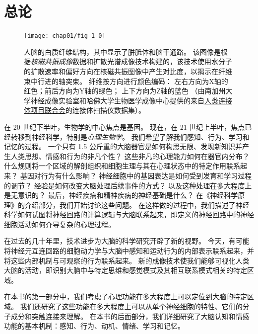\hypersetup{bookmarksopen=false}

\part{总论}

\begin{figure}[htbp]
	\centering
	\texttt{[image: chap01/fig\_1\_0]}
	\caption{人脑的白质纤维结构，其中显示了胼胝体和脑干通路。
		该图像是根据\textit{核磁共振成像}数据和扩散光谱成像技术构建的，该技术使用水分子的扩散速率和偏好方向在核磁共振图像中产生对比度，以揭示在纤维束中行进的轴突束。
		纤维按方向进行颜色编码：
		左右方向为X轴的红色；前后方向为Y轴的绿色；
		上下方向为Z轴的蓝色
		（由南加州大学神经成像实验室和哈佛大学生物医学成像中心提供的来自\href{www.humanconnetomproject.org}{人类连接体项目联合会}的连接体扫描仪数据集）。}
	\label{fig:1_0}
\end{figure}

在 20 世纪下半叶，生物学的中心焦点是基因。
现在，在 21 世纪上半叶，焦点已经转移到神经科学，特别是\textit{心理生物学}。
我们希望了解我们感知、行为、学习和记忆的过程。
一个只有 1.5 公斤重的大脑器官是如何构思无限、发现新知识并产生人类思想、情感和行为的非凡个性？
这些非凡的心理能力如何在器官内分布？
什么规则将一个区域的解剖组织和细胞生理与其在心理状态中的特定作用联系起来？
基因对行为有什么影响？
神经细胞中的基因表达是如何受到发育和学习过程的调节？
经验是如何改变大脑处理后续事件的方式？
以及这种处理在多大程度上是无意识的？
最后，神经疾病和精神疾病的神经基础是什么？
在《神经科学原理》的介绍部分，我们开始讨论这些问题。
在这样做的过程中，我们描述了神经科学如何试图将神经回路的计算逻辑与大脑联系起来，即定义的神经回路中的神经细胞活动如何介导复杂的心理过程。


在过去的几十年里，技术进步为大脑的科学研究开辟了新的视野。
今天，有可能将神经元互连回路的细胞动力学与大脑中感知和运动行为的内部表示联系起来，并将这些内部机制与可观察的行为联系起来。
新的成像技术使我们能够可视化人类大脑的活动，即识别大脑中与特定思维和感觉模式及其相互联系模式相关的特定区域。


在本书的第一部分中，我们考虑了心理功能在多大程度上可以定位到大脑的特定区域。
我们还研究了这些功能在多大程度上可以从单个神经细胞的特性、它们的分子成分和突触连接来理解。
在本书的后面部分，我们详细研究了大脑认知和情感功能的基本机制：感知、行为、动机、情绪、学习和记忆。


